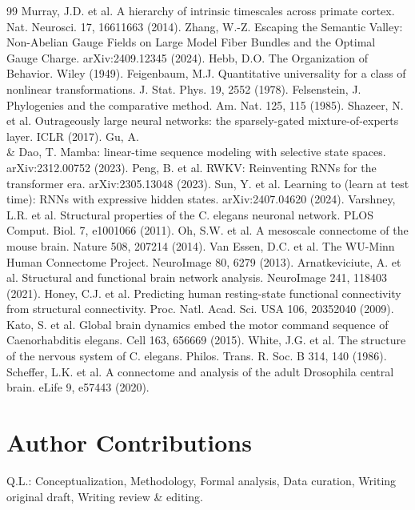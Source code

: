 \documentclass[a4paper,12pt]{article}
\begin{document}
\begin{thebibliography}{99}
 Murray, J.D. et al. A hierarchy of intrinsic timescales across primate cortex. Nat. Neurosci. 17, 16611663 (2014).
 Zhang, W.-Z. Escaping the Semantic Valley: Non-Abelian Gauge Fields on Large Model Fiber Bundles and the Optimal Gauge Charge. arXiv:2409.12345 (2024).
 Hebb, D.O. The Organization of Behavior. Wiley (1949).
 Feigenbaum, M.J. Quantitative universality for a class of nonlinear transformations. J. Stat. Phys. 19, 2552 (1978).
 Felsenstein, J. Phylogenies and the comparative method. Am. Nat. 125, 115 (1985).
 Shazeer, N. et al. Outrageously large neural networks: the sparsely-gated mixture-of-experts layer. ICLR (2017).
 Gu, A. \\& Dao, T. Mamba: linear-time sequence modeling with selective state spaces. arXiv:2312.00752 (2023).
 Peng, B. et al. RWKV: Reinventing RNNs for the transformer era. arXiv:2305.13048 (2023).
 Sun, Y. et al. Learning to (learn at test time): RNNs with expressive hidden states. arXiv:2407.04620 (2024).
 Varshney, L.R. et al. Structural properties of the C. elegans neuronal network. PLOS Comput. Biol. 7, e1001066 (2011).
 Oh, S.W. et al. A mesoscale connectome of the mouse brain. Nature 508, 207214 (2014).
 Van Essen, D.C. et al. The WU-Minn Human Connectome Project. NeuroImage 80, 6279 (2013).
 Arnatkeviciute, A. et al. Structural and functional brain network analysis. NeuroImage 241, 118403 (2021).
 Honey, C.J. et al. Predicting human resting-state functional connectivity from structural connectivity. Proc. Natl. Acad. Sci. USA 106, 20352040 (2009).
 Kato, S. et al. Global brain dynamics embed the motor command sequence of Caenorhabditis elegans. Cell 163, 656669 (2015).
 White, J.G. et al. The structure of the nervous system of C. elegans. Philos. Trans. R. Soc. B 314, 140 (1986).
 Scheffer, L.K. et al. A connectome and analysis of the adult Drosophila central brain. eLife 9, e57443 (2020).
\end{thebibliography}

\section*{Author Contributions}
Q.L.: Conceptualization, Methodology, Formal analysis, Data curation, Writing  original draft, Writing  review \& editing.
\end{document}
